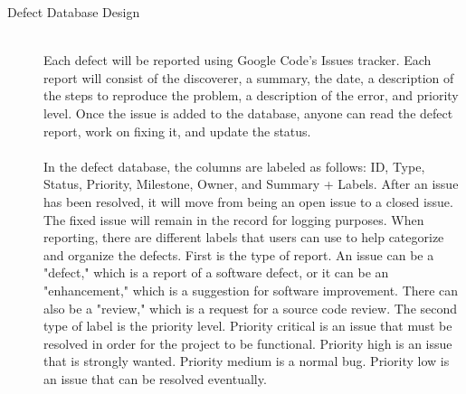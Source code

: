 \documentclass[11pt, letterpaper]{report}
\begin{document}
\begin{description}
\hypertarget{DD} {}
\item[Defect Database Design] \hfill \\
Each defect will be reported using Google Code's Issues tracker. Each report will consist of the discoverer, a summary, the date, a description of the steps to reproduce the problem, a description of the error, and priority level. Once the issue is added to the database, anyone can read the defect report, work on fixing it, and update the status. \\ \\
In the defect database, the columns are labeled as follows: ID, Type, Status, Priority, Milestone, Owner, and Summary + Labels. After an issue has been resolved, it will move from being an open issue to a closed issue. The fixed issue will remain in the record for logging purposes.
When reporting, there are different labels that users can use to help categorize and organize the defects. First is the type of report. An issue can be a "defect," which is a report of a software defect, or it can be an "enhancement," which is a suggestion for software improvement. There can also be a "review," which is a request for a source code review. The second type of label is the priority level. Priority critical is an issue that must be resolved in order for the project to be functional. Priority high is an issue that is strongly wanted. Priority medium is a normal bug. Priority low is an issue that can be resolved eventually. 

\newpage
\hypertarget{CSS} {}




\end{description}
\end{document}
